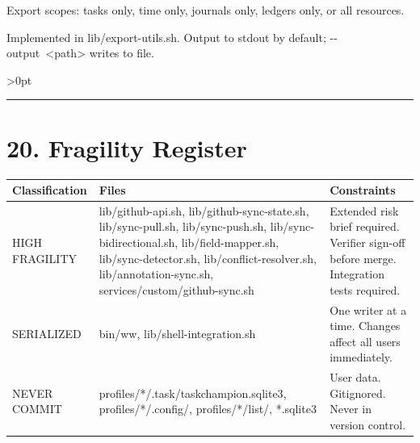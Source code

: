 \documentclass[11pt, a4paper, DIV=14]{scrartcl}
\renewcommand{\texttt}[1]{{\ttfamily\fontsize{8.5}{10.5}\selectfont\color{BabbNavy}#1}}
\let\origRule\rule
\renewcommand{\rule}[3][0pt]{%
  \ifnum\dimexpr#3\relax>0pt
    \par\vspace{2pt}\noindent{\color{BabbBorder}\origRule[#1]{#2}{#3}}\par\vspace{2pt}%
  \else
    \origRule[#1]{#2}{#3}%
  \fi
}
\begin{document}
Export scopes: tasks only, time only, journals only, ledgers only, or
all resources.

Implemented in \texttt{lib/export-utils.sh}. Output to stdout by
default; \texttt{-\/-output\ \textless{}path\textgreater{}} writes to
file.

\begin{center}\rule{0.5\linewidth}{0.5pt}\end{center}

\section{20. Fragility Register}\label{fragility-register}

{\def\LTcaptype{none} %
\begin{longtable}[]{@{}
  >{\raggedright\arraybackslash}p{}
  >{\raggedright\arraybackslash}p{}
  >{\raggedright\arraybackslash}p{}@{}}
\toprule\noalign{}
\begin{minipage}[b]{\linewidth}\raggedright
Classification
\end{minipage} & \begin{minipage}[b]{\linewidth}\raggedright
Files
\end{minipage} & \begin{minipage}[b]{\linewidth}\raggedright
Constraints
\end{minipage} \\
\midrule\noalign{}
\endhead
\bottomrule\noalign{}
\endlastfoot
HIGH FRAGILITY & \texttt{lib/github-api.sh},
\texttt{lib/github-sync-state.sh}, \texttt{lib/sync-pull.sh},
\texttt{lib/sync-push.sh}, \texttt{lib/sync-bidirectional.sh},
\texttt{lib/field-mapper.sh}, \texttt{lib/sync-detector.sh},
\texttt{lib/conflict-resolver.sh}, \texttt{lib/annotation-sync.sh},
\texttt{services/custom/github-sync.sh} & Extended risk brief required.
Verifier sign-off before merge. Integration tests required. \\
SERIALIZED & \texttt{bin/ww}, \texttt{lib/shell-integration.sh} & One
writer at a time. Changes affect all users immediately. \\
NEVER COMMIT & \texttt{profiles/*/.task/taskchampion.sqlite3},
\texttt{profiles/*/.config/}, \texttt{profiles/*/list/},
\texttt{*.sqlite3} & User data. Gitignored. Never in version control. \\
\end{longtable}
}
\end{document}
